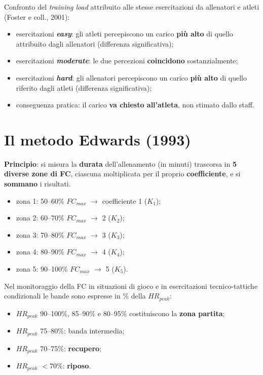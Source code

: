 Confronto del \textit{training load} attribuito alle stesse esercitazioni da allenatori e atleti
(Foster e coll., 2001):
\begin{itemize}
  \item esercitazioni \textbf{\textit{easy}}: gli atleti percepiscono un carico \textbf{più alto} di
    quello attribuito dagli allenatori (differenza significativa);
  \item esercitazioni \textbf{\textit{moderate}}: le due percezioni \textbf{coincidono}
    sostanzialmente;
  \item esercitazioni \textbf{\textit{hard}}: gli allenatori percepiscono un carico \textbf{più alto}
    di quello riferito dagli atleti (differenza significativa);
  \item conseguenza pratica: il carico \textbf{va chiesto all'atleta}, non stimato dallo staff.
\end{itemize}

\section{Il metodo Edwards (1993)}

\textbf{Principio}: si misura la \textbf{durata} dell'allenamento (in minuti) trascorsa in
\textbf{5 diverse zone di FC}, ciascuna moltiplicata per il proprio \textbf{coefficiente}, e si
\textbf{sommano} i risultati.

\begin{itemize}
  \item zona 1: 50--60\% $FC_{max}$ $\rightarrow$ coefficiente 1 ($K_1$);
  \item zona 2: 60--70\% $FC_{max}$ $\rightarrow$ 2 ($K_2$);
  \item zona 3: 70--80\% $FC_{max}$ $\rightarrow$ 3 ($K_3$);
  \item zona 4: 80--90\% $FC_{max}$ $\rightarrow$ 4 ($K_4$);
  \item zona 5: 90--100\% $FC_{max}$ $\rightarrow$ 5 ($K_5$).
\end{itemize}

Nel monitoraggio della FC in situazioni di gioco e in esercitazioni tecnico-tattiche condizionali le
bande sono espresse in \% della $HR_{peak}$:
\begin{itemize}
  \item $HR_{peak}$ 90--100\%, 85--90\% e 80--95\% costituiscono la \textbf{zona partita};
  \item $HR_{peak}$ 75--80\%: banda intermedia;
  \item $HR_{peak}$ 70--75\%: \textbf{recupero};
  \item $HR_{peak}$ $<70\%$: \textbf{riposo}.
\end{itemize}

